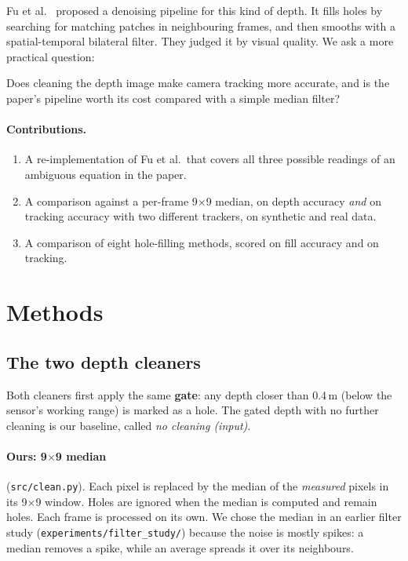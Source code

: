 \documentclass[11pt,a4paper]{article}
\begin{document}
\noindent
Fu et al.\ \cite{fu2012} proposed a denoising pipeline for this kind of depth. It fills holes by searching for
matching patches in neighbouring frames, and then smooths with a spatial-temporal bilateral filter.
They judged it by visual quality. We ask a more practical question:

\begin{keybox}[title=Research question]
Does cleaning the depth image make camera tracking more accurate, and is the paper's pipeline worth its cost
compared with a simple median filter?
\end{keybox}

\paragraph{Contributions.}
\begin{enumerate}
  \item A re-implementation of Fu et al.\ that covers all three possible readings of an ambiguous equation in the paper.
  \item A comparison against a per-frame 9$\times$9 median, on depth accuracy \emph{and} on tracking accuracy with two
        different trackers, on synthetic and real data.
  \item A comparison of eight hole-filling methods, scored on fill accuracy and on tracking.
\end{enumerate}

\section{Methods}

\subsection{The two depth cleaners}

Both cleaners first apply the same \textbf{gate}: any depth closer than 0.4\,m (below the sensor's working range)
is marked as a hole. The gated depth with no further cleaning is our baseline, called \emph{no cleaning (input)}.

\paragraph{Ours: 9$\times$9 median} (\texttt{src/clean.py}).
Each pixel is replaced by the median of the \emph{measured} pixels in its 9$\times$9 window. Holes are ignored when
the median is computed and remain holes. Each frame is processed on its own. We chose the median in an earlier
filter study (\texttt{experiments/filter\_study/}) because the noise is mostly spikes: a median removes a spike,
while an average spreads it over its neighbours.
\end{document}
